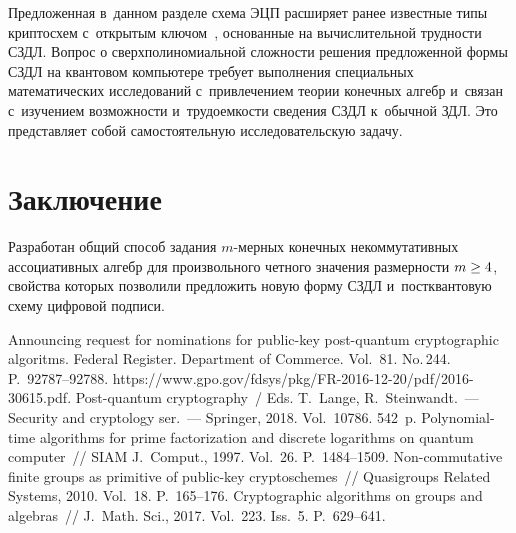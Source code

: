 \begin{multicols}{2}
  Предложенная в~данном разделе схема ЭЦП расширяет ранее известные 
типы криптосхем с~открытым ключом~\cite{4-f}, основанные на 
вычислительной трудности СЗДЛ. Вопрос о сверхполиномиальной сложности 
решения предложенной формы СЗДЛ на квантовом компьютере требует 
выполнения специальных математических исследований с~привлечением 
теории конечных алгебр и~связан с~изучением возможности и~трудоемкости 
сведения СЗДЛ к~обычной ЗДЛ. Это представляет собой самостоятельную 
исследовательскую задачу. 

  \vspace*{-9pt}
  
\section{Заключение}

\vspace*{-2pt}

  Разработан общий способ задания $m$-мер\-ных конечных некоммутативных 
ассоциативных алгебр для произвольного четного значения размерности 
$m\hm\geq4$, свойства которых позволили предложить новую форму СЗДЛ
 и~постквантовую схему цифровой 
подписи. 

  \vspace*{-9pt}
  
{\small\frenchspacing
 {%
 \begin{thebibliography}{9}
 
 \vspace*{-2pt}
 
Announcing request for nominations for public-key post-quantum cryptographic 
algoritms. Federal Register. Department of Commerce.  Vol.~81. No.\,244. P.~92787--92788.
{\sf  
https://www.gpo.gov/fdsys/pkg/FR-2016-12-20/pdf/2016-30615.pdf}.
Post-quantum cryptography~/ Eds. T.~Lange, R.~Steinwandt.~--- 
Security and cryptology ser.~--- Springer, 2018. Vol.~10786. 542~p.
 Polynomial-time algorithms for prime factorization and discrete logarithms 
on quantum computer~// SIAM J.~Comput., 1997. Vol.~26. P.~1484--1509.
 Non-commutative finite groups as primitive of public-key 
cryptoschemes~// Quasigroups Related Systems, 2010. Vol.~18. P.~165--176.
Cryptographic algorithms on groups and algebras~// J.~Math. Sci., 2017. Vol.~223. Iss.~5. 
P.~629--641.
\end{thebibliography}

 }
 }

\end{multicols}

